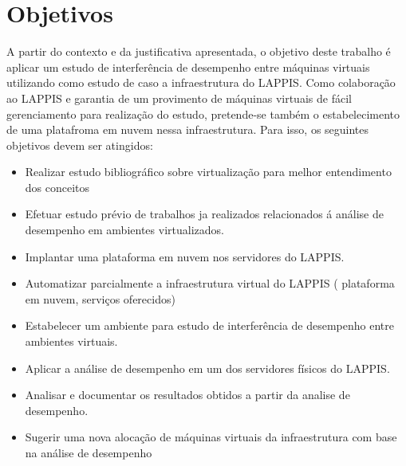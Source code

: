 \section{Objetivos}


A partir do contexto e da justificativa apresentada, o objetivo deste trabalho é aplicar um estudo de interferência de desempenho entre máquinas virtuais utilizando como estudo de caso a infraestrutura do LAPPIS. Como colaboração ao LAPPIS e garantia de um provimento de máquinas virtuais de fácil gerenciamento para realização do estudo, pretende-se também o estabelecimento de uma platafroma em nuvem nessa infraestrutura. Para isso, os seguintes objetivos devem ser atingidos: 

\begin{itemize}
\item Realizar estudo bibliográfico sobre virtualização para melhor entendimento dos conceitos
\item Efetuar estudo prévio de trabalhos ja realizados relacionados á análise de desempenho em ambientes virtualizados.
\item Implantar uma plataforma em nuvem nos servidores do LAPPIS.
\item Automatizar parcialmente a infraestrutura virtual do LAPPIS ( plataforma em nuvem, serviços oferecidos)
\item Estabelecer um ambiente para estudo de interferência de desempenho entre ambientes virtuais.
\item Aplicar a análise de desempenho em um dos servidores físicos do LAPPIS.
\item Analisar e documentar os resultados obtidos a partir da analise de desempenho.
\item Sugerir uma nova alocação de máquinas virtuais da infraestrutura com base na análise de desempenho


\end{itemize}

